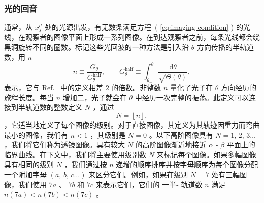 \documentclass[aps,reprint,superscriptaddress,nofootinbib,floatfix,longbibliography,preprintnumbers]{revtex4-1}
\newcommand{\dd}{\mathrm{d}}
\begin{document}
   \subsubsection{光的回音  }    
   \label{subsubsec:light echoes}    通常，从    $x^{\mu}_s$    处的光源出发，有无数条满足方程~(    \ref{eq:imaging condition}    ) 的光线，在观察者的图像平面上形成一系列图像。在到达观察者之前，每条光线都会绕黑洞旋转不同的圈数。标记这些光回波的一种方法是引入沿    $\theta$    方向传播的半轨道数，用    $n$    
   \begin{equation}
    n\equiv\frac{G_{\theta}}{G_{\theta}^{\text{half}}},\qquad G_{\theta}^{\text{half}}\equiv\int_{\theta_-}^{\theta_+}\frac{\dd\theta}{\sqrt{\Theta(\theta)}},
    \label{eq:n}
\end{equation}    表示，它与 Ref.~    \cite{Gralla:2019drh}    中的定义相差    $2$    的倍数。非整数    $n$    量化了光子在    $\theta$    方向经历的旅程长度。每当    $n$    增加二，光子就会在    $\theta$    中经历一次完整的振荡。此定义可以连接到半轨道数的整数定义    $N$    ，通过    \begin{equation}
    N=\left\lfloor n \right\rfloor,
    \label{eq:N}
\end{equation}    ，它适当地定义了每个图像的级别。对于直接图像，其定义为其轨迹因重力而弯曲最小的图像，我们有  {    $n < 1$      }  ，其级别是    $N = 0$    。以下高阶图像具有    $N=1,\,2,\,3\ldots$    ，我们将它们称为透镜图像。具有较大    $N$    的高阶图像渐近地接近    $\alpha$    -    $\beta$    平面上的临界曲线。在下文中，我们将主要使用级别数    $N$    来标记每个图像。如果多幅图像具有相同的级别    $N$    ，我们通过按    $n$    递增的顺序排序并按字母顺序为每个图像分配一个附加字母    $(a,\,b,\,c\ldots)$    来区分它们。例如，如果在级别    $N = 7$    处有三幅图像，我们使用    $7a$    、    $7b$    和    $7c$    来表示它们，它们的  { 一半-   }  轨道数    $n$    满足    $n(7a) < n(7b) < n(7c)$    。
\end{document}
